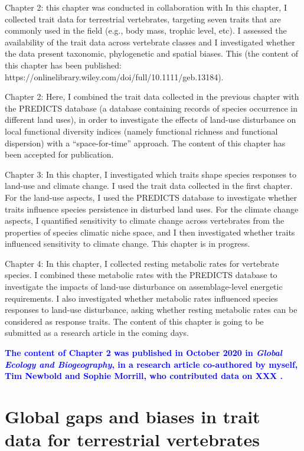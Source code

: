 \documentclass[11pt]{report}
\begin{document}
Chapter 2: this chapter was conducted in collaboration with 
In this chapter, I collected trait data for terrestrial vertebrates, targeting seven traits that are commonly used in the field (e.g., body mass, trophic level, etc). I assessed the availability of the trait data across vertebrate classes and I investigated whether the data present taxonomic, phylogenetic and spatial biases. This  (the content of this chapter has been published: https://onlinelibrary.wiley.com/doi/full/10.1111/geb.13184).

Chapter 2: Here, I combined the trait data collected in the previous chapter with the PREDICTS database (a database containing records of species occurrence in different land uses), in order to investigate the effects of land-use disturbance on local functional diversity indices (namely functional richness and functional dispersion) with a “space-for-time” approach. The content of this chapter has been accepted for publication. 

Chapter 3: In this chapter, I investigated which traits shape species responses to land-use and climate change. I used the trait data collected in the first chapter. For the land-use aspects, I used the PREDICTS database to investigate whether traits influence species persistence in disturbed land uses. For the climate change aspects, I quantified sensitivity to climate change across vertebrates from the properties of species climatic niche space, and I then investigated whether traits influenced sensitivity to climate change. This chapter is in progress.

Chapter 4: In this chapter, I collected resting metabolic rates for vertebrate species. I combined these metabolic rates with the PREDICTS database to investigate the impacts of land-use disturbance on assemblage-level energetic requirements. I also investigated whether metabolic rates influenced species responses to land-use disturbance, asking whether resting metabolic rates can be considered as response traits. The content of this chapter is going to be submitted as a research article in the coming days. 


\textcolor{blue}{\textbf{The content of Chapter 2 was published in October 2020 in \textit{Global Ecology and Biogeography}, in a research article co-authored by myself, Tim Newbold and Sophie Morrill, who contributed data on XXX \citep{Etard2020}.}}

\chapter{Global gaps and biases in trait data for terrestrial vertebrates}
\end{document}
